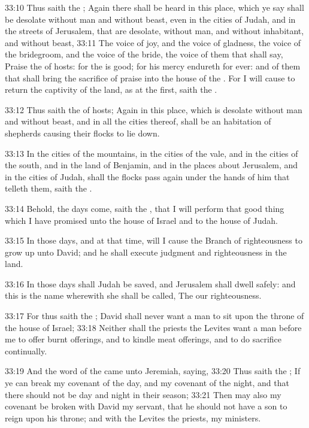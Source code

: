33:10 Thus saith the \LORD; Again there shall be heard in this place,
which ye say shall be desolate without man and without beast, even in
the cities of Judah, and in the streets of Jerusalem, that are
desolate, without man, and without inhabitant, and without beast,
33:11 The voice of joy, and the voice of gladness, the voice of the
bridegroom, and the voice of the bride, the voice of them that shall
say, Praise the \LORD of hosts: for the \LORD is good; for his mercy
endureth for ever: and of them that shall bring the sacrifice of
praise into the house of the \LORD. For I will cause to return the
captivity of the land, as at the first, saith the \LORD.

33:12 Thus saith the \LORD of hosts; Again in this place, which is
desolate without man and without beast, and in all the cities thereof,
shall be an habitation of shepherds causing their flocks to lie down.

33:13 In the cities of the mountains, in the cities of the vale, and
in the cities of the south, and in the land of Benjamin, and in the
places about Jerusalem, and in the cities of Judah, shall the flocks
pass again under the hands of him that telleth them, saith the \LORD.

33:14 Behold, the days come, saith the \LORD, that I will perform that
good thing which I have promised unto the house of Israel and to the
house of Judah.

33:15 In those days, and at that time, will I cause the Branch of
righteousness to grow up unto David; and he shall execute judgment and
righteousness in the land.

33:16 In those days shall Judah be saved, and Jerusalem shall dwell
safely: and this is the name wherewith she shall be called, The \LORD
our righteousness.

33:17 For thus saith the \LORD; David shall never want a man to sit
upon the throne of the house of Israel; 33:18 Neither shall the
priests the Levites want a man before me to offer burnt offerings, and
to kindle meat offerings, and to do sacrifice continually.

33:19 And the word of the \LORD came unto Jeremiah, saying, 33:20 Thus
saith the \LORD; If ye can break my covenant of the day, and my
covenant of the night, and that there should not be day and night in
their season; 33:21 Then may also my covenant be broken with David my
servant, that he should not have a son to reign upon his throne; and
with the Levites the priests, my ministers.

